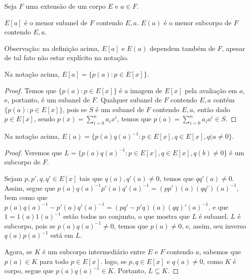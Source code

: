 \begin{definition}
    Seja $F$ uma extensão de um corpo $E$ e $a \in F$.

    $E[a]$ é o menor subanel de $F$ contendo $E, a$.
    $E(a)$ é o menor subcorpo de $F$ contendo $E, a$.
\end{definition}

Observação: na definição acima, $E[a]$ e $E(a)$ dependem também de $F$, apesar de tal fato não estar explícito na notação.
\begin{lemma}
    Na notação acima, $E[a]=\{p(a): p \in E[x]\}$.
\end{lemma}
\begin{proof}
    Temos que $\{p(a): p \in E[x]\}$ é a imagem de $E[x]$ pela avaliação em $a$, e, portanto, é um subanel de $F$.
    Qualquer subanel de $F$ contendo $E, a$ contém $\{p(a): p \in E[x]\}$, pois se $S$ é um subanel de $F$ contendo $E, a$, então dado $p\in E[x]$, sendo $p(x)=\sum_{i=0}^n a_ix^i$, temos que $p(a)=\sum_{i=0}^n a_i a^i \in S$.
\end{proof}

\begin{lemma}
    Na notação acima, $E(a)=\{p(a)q(a)^{-1}: p \in E[x], q \in E[x], q(a\neq 0\}$.
\end{lemma}
\begin{proof}
    Veremos que $L=\{p(a)q(a)^{-1}: p \in E[x], q \in E[x], q(b)\neq 0\}$ é um subcorpo de $F$.

    Sejam $p, p', q, q' \in E[x]$ tais que $q(a), q'(a)\neq 0$, temos que $qq'(a)\neq 0$.
    Assim, segue que $p(a)q(a)^{-1}p'(a)q'(a)^{-1}=(pp')(a)(qq')(a)^{-1}$, bem como que $p(a)q(a)^{-1}-p'(a)q'(a)^{-1}=(pq'-p'q)(a)(qq)'(a)^{-1}$, e que $1=1(a)1(a)^{-1}$ estão todos no conjunto, o que mostra que $L$ é subanel.
    $L$ é subcorpo, pois se $p(a)q(a)^{-1}\neq 0$, temos que $p(a)\neq 0$, e, assim, seu inverso $q(a)p(a)^{-1}$ está em $L$.

    Agora, se $K$ é um subcorpo intermediário entre $E$ e $F$ contendo $a$, sabemos que $p(a)\in K$ para todo $p \in E[x]$. logo, se $p, q \in E[x]$ e $q(a)\neq 0$, como $K$ é corpo, segue que $p(a)q(a)^{-1}\in K$. Portanto, $L\subseteq K$.
\end{proof}
 
